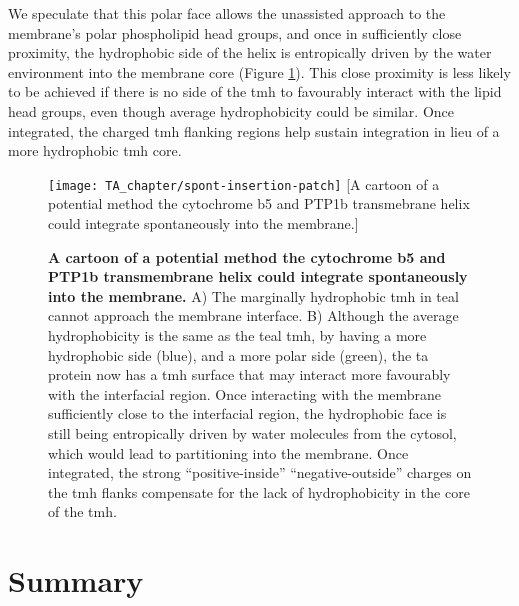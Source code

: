 We speculate that this polar face allows the unassisted approach to the membrane's polar phospholipid head groups, and once in sufficiently close proximity, the hydrophobic side of the helix is entropically driven by the water environment into the membrane core (Figure \ref{fig:spont-insertion-patch}).
This close proximity is less likely to be achieved if there is no side of the \gls{tmh} to favourably interact with the lipid head groups, even though average hydrophobicity could be similar.
Once integrated, the charged \gls{tmh} flanking regions help sustain integration in lieu of a more hydrophobic \gls{tmh} core.

\begin{figure}[!ht]
\centering
\texttt{[image: TA\_chapter/spont-insertion-patch]}
        [A cartoon of a potential method the cytochrome b5 and PTP1b transmebrane helix could integrate spontaneously into the membrane.]{\textbf{A cartoon of a potential method the cytochrome b5 and PTP1b transmembrane helix could integrate spontaneously into the membrane.}
        A) The marginally hydrophobic \gls{tmh} in teal cannot approach the membrane interface.
        B) Although the average hydrophobicity is the same as the teal \gls{tmh}, by having a more hydrophobic side (blue), and a more polar side (green), the \gls{ta} protein now has a \gls{tmh} surface that may interact more favourably with the interfacial region.
        Once interacting with the membrane sufficiently close to the interfacial region, the hydrophobic face is still being entropically driven by water molecules from the cytosol, which would lead to partitioning into the membrane.
        Once integrated, the strong ``positive\--inside'' ``negative\--outside'' charges on the \gls{tmh} flanks compensate for the lack of hydrophobicity in the core of the \gls{tmh}.

}

\label{fig:spont-insertion-patch}
\end{figure}

\section{Summary}

